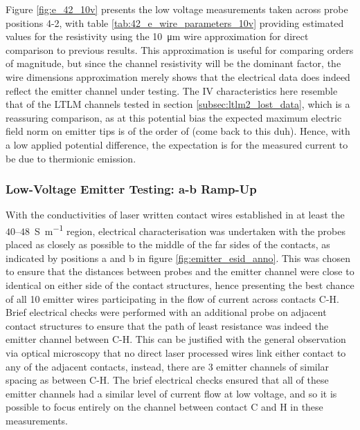 \begin{refsection}
Figure \ref{fig:e_42_10v} presents the low voltage measurements taken across probe positions 4-2, with table \ref{tab:42_e_wire_parameters_10v} providing estimated values for the resistivity using the 10~\si{\micro\metre} wire approximation for direct comparison to previous results. This approximation is useful for comparing orders of magnitude, but since the channel resistivity will be the dominant factor, the wire dimensions approximation merely shows that the electrical data does indeed reflect the emitter channel under testing. The IV characteristics here resemble that of the LTLM channels tested in section \ref{subsec:ltlm2_lost_data}, which is a reassuring comparison, as at this potential bias the expected maximum electric field norm on emitter tips is of the order of (come back to this duh). Hence, with a low applied potential difference, the expectation is for the measured current to be due to thermionic emission.

\subsubsection{Low-Voltage Emitter Testing: a-b Ramp-Up}
With the conductivities of laser written contact wires established in at least the $40$--$48$~\si{\siemens\per\metre} region, electrical characterisation was undertaken with the probes placed as closely as possible to the middle of the far sides of the contacts, as indicated by positions a and b in figure \ref{fig:emitter_esid_anno}. This was chosen to ensure that the distances between probes and the emitter channel were close to identical on either side of the contact structures, hence presenting the best chance of all 10 emitter wires participating in the flow of current across contacts C-H. Brief electrical checks were performed with an additional probe on adjacent contact structures to ensure that the path of least resistance was indeed the emitter channel between C-H. This can be justified with the general observation via optical microscopy that no direct laser processed wires link either contact to any of the adjacent contacts, instead, there are 3 emitter channels of similar spacing as between C-H. The brief electrical checks ensured that all of these emitter channels had a similar level of current flow at low voltage, and so it is possible to focus entirely on the channel between contact C and H in these measurements.


\end{refsection}
